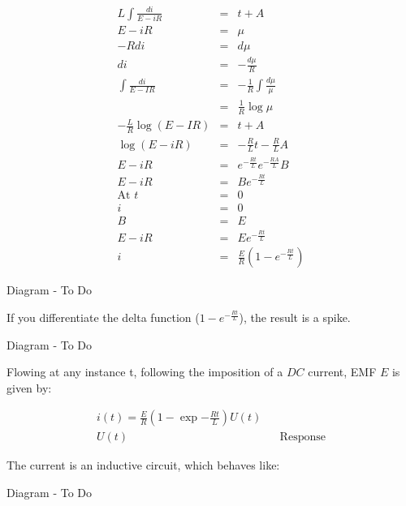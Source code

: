 \documentclass[a4paper,12pt]{article}
\begin{document}
\begin{eqnarray*}
L \int \frac{di}{E - iR} & = & t + A \\
E - iR & = & \mu \\
- R di & = & d \mu \\
di & = & - \frac{d \mu}{R} \\
\int \frac{di}{E - IR} & = & - \frac{1}{R} \int \frac{d \mu}{\mu} \\
							  & = & \frac{1}{R} \log{\mu} \\
- \frac{L}{R} \log{(E - IR)} & = & t + A \\							  
\log{(E - iR)} & = & - \frac{R}{L} t - \frac{R}{L} A \\
E - iR & = & e^{-\frac{R t}{L}} e^{- \frac{R A}{L}} B \\
E - iR & = & B e^{- \frac{R t}{L}} \\
\mbox{At } t & = & 0 \\
i & = & 0 \\
B & = & E \\
E - iR & = & E e^{- \frac{R t}{L}} \\
i & = & \frac{E}{R} \left( 1 - e^{-\frac{R t}{L}} \right)
\end{eqnarray*}

\begin{table}[hbtp]

Diagram - To Do

\end{table}

If you differentiate the delta function ($1 - e^{- \frac{R t}{L}}$), the
result is a spike.


\begin{table}[hbtp]

Diagram - To Do

\end{table}

Flowing at any instance t, following the imposition of a $DC$ current,
EMF $E$ is given by:

\begin{eqnarray*}
i(t) = \frac{E}{R} \left( 1 - \exp{-\frac{R t}{L}} \right) U(t) \\
U(t) & & \mbox{Response}
\end{eqnarray*}

The current is an inductive circuit, which behaves like:

\begin{table}[hbtp]

Diagram - To Do

\end{table}
\end{document}
